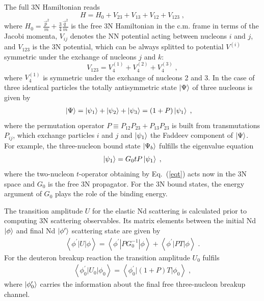 The full 3N Hamiltonian reads 
\begin{equation}
H = H_{0} + V_{23} + V_{13} + V_{12} + V_{123}\;,
\end{equation}
where $H_{0} = \frac{\!\vec{\,p}^{2}}{m} + \frac{3}{4}\frac{\!\vec{\,q}^{2}}{m}$ is the free 3N Hamiltonian in the c.m. frame in terms of the Jacobi momenta, $V_{ij}$ denotes the NN potential acting between nucleons $i$ and $j$, and $V_{123}$ is the 3N potential, which can be always splitted to potential $V^{(i)}$ symmetric under the exchange of nucleons $j$ and $k$:
\begin{equation}
V_{123} = V^{(1)}_{4} + V^{(2)}_{4} + V^{(3)}_{4}\;,
\end{equation}
where $V^{(1)}_{4}$ is symmetric under the exchange of nucleons 2 and 3. In the case of three identical particles the totally antisymmetric state $\ket{\Psi}$ of three nucleons is given by
\begin{equation}
\begin{split}
\ket{\Psi} &= \ket{\psi_{1}} + \ket{\psi_{2}} + \ket{\psi_{3}} = (1+P)\ket{\psi_{1}}\;,
\end{split}
\end{equation}
where the permutation operator $P \equiv P_{12} P_{23} + P_{13} P_{23}$ is built from transmutations $P_{ij}$, which exchange particles $i$ and $j$ and $\ket{\psi_{1}}$ the Faddeev component of $\ket{\Psi}$. For example, the three-nucleon bound state $\ket{\Psi_{b}}$ fulfills the eigenvalue equation~\cite{nogga1997triton}
\begin{equation}
\ket{\psi_{1}} = G_{0} t P \ket{\psi_{1}}\;,
\end{equation}
where the two-nucleon $t$-operator obtaining by Eq.~(\ref{eqt}) acts now in the 3N space and $G_{0}$ is the free 3N propagator. For the 3N bound states, the energy argument of $G_{0}$ plays the role of the binding energy. 

The transition amplitude $U$ for the elastic Nd scattering is calculated prior to computing 3N scattering observables. Its matrix elements between the initial Nd $\ket{\phi}$ and final Nd $\ket{\phi^{\prime}}$ scattering state are given by~\cite{Glockle1996}
\begin{equation}
\begin{split}
\left<\phi^{\prime}|U|\phi\right> = \left<\phi^{\prime}|PG^{-1}_{0}|\phi\right> + \left<\phi^{\prime}|PT|\phi\right>\;.
\end{split}
\label{FaddeevElastic}
\end{equation}
For the deuteron breakup reaction the transition amplitude $U_{0}$ fulfils
\begin{equation}
\begin{split}
\left<\phi^{\prime}_{0}|U_{0}|\phi_{0}\right> = \left<\phi^{\prime}_{0}|(1 + P)T|\phi_{0}\right>\;,
\end{split}
\label{FaddeevBreakup}
\end{equation}
where $\ket{\phi^{\prime}_{0}}$ carries the information about the final free three-nucleon breakup channel.


